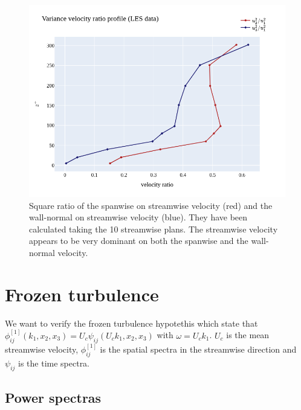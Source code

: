 \documentclass[]{article}
\theoremstyle{plain}
\theoremstyle{remark}
\begin{document}
\begin{figure}[h!]
	\begin{center}
	\includegraphics[width=\textwidth]{../output/RANS/velocity_ratio_profiles.png}
	\caption{Square ratio of the spanwise on streamwise velocity (red) and the wall-normal on streamwise velocity (blue). They have been calculated taking the 10 streamwise plans. The streamwise velocity appears to be very dominant on both the spanwise and the wall-normal velocity.}
	\end{center}
\end{figure}

\section{Frozen turbulence}
We want to verify the frozen turbulence hypotethis which state that $\phi_{ij}^{[1]}(k_1,x_2,x_3)=U_c\psi_{ij}(U_ck_1,x_2,x_3)$ with $\omega=U_ck_1$. $U_c$ is the mean streamwise velocity, $\phi_{ij}^{[1]}$ is the spatial spectra in the streamwise direction and $\psi_{ij}$ is the time spectra.
\subsection{Power spectras}
\end{document}
